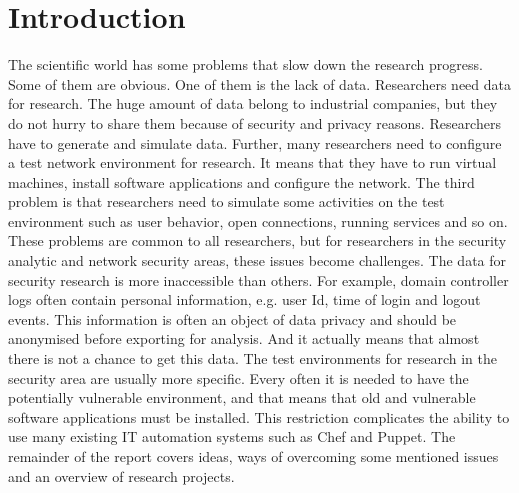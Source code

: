 \section{Introduction}

The scientific world has some problems that slow down the research progress. Some of them are obvious. One of them is the lack of data. Researchers need data for research. The huge amount of data belong to industrial companies, but they do not hurry to share them because of security and privacy reasons. Researchers have to generate and simulate data. Further, many researchers need to configure a test network environment for research. It means that they have to run virtual machines, install software applications and configure the network. The third problem is that researchers need to simulate some activities on the test environment such as user behavior, open connections, running services and so on. These problems are common to all researchers, but for researchers in the security analytic and network security areas, these issues become challenges. The data for security research is more inaccessible than others. For example, domain controller logs often contain personal information, e.g. user Id, time of login and logout events. This information is often an object of data privacy and should be anonymised before exporting for analysis. And it actually means that almost there is not a chance to get this data. The test environments for research in the security area are usually more specific. Every often it is needed to have the potentially vulnerable environment, and that means that old and vulnerable software applications must be installed. This restriction complicates the ability to use many existing IT automation systems such as Chef and Puppet. The remainder  of the report covers ideas, ways of overcoming some mentioned issues and an overview of research projects.

